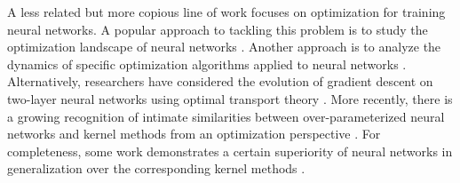 A less related but more copious line of work focuses on optimization for training neural networks. A popular approach to tackling this problem is to study the optimization landscape of neural networks \citep{choromanska2015loss,soudry2017exponentially,zhou2017critical,safran2018spurious,du2018power,liang2018adding,soltanolkotabi2018theoretical}. Another approach is to analyze the dynamics of specific optimization algorithms applied to neural networks \citep{tian2017analytical,li2017convergence,soltanolkotabi2017learning,brutzkus2017globally,du2018gradient,li2018learning,allen2018learning,zou2018stochastic,du2019gradient2,allen2019convergence}. Alternatively, researchers have considered the evolution of gradient descent on two-layer neural networks using optimal transport theory \citep{song2018mean,chizat2018global,sirignano2019mean,rotskoff2018neural}. More recently, there is a growing recognition of intimate similarities between over-parameterized neural networks and kernel methods from an optimization perspective \citep{zhang2016understanding,daniely2017sgd,belkin2018understand,jacot2018neural,yang2019scaling, arora2019exact,lee2019wide,ma2019comparative}. For completeness, some work demonstrates a certain superiority of neural networks in generalization over the corresponding kernel methods \citep{wei2018margin,allen2019can,ghorbani2019linearized}. 



